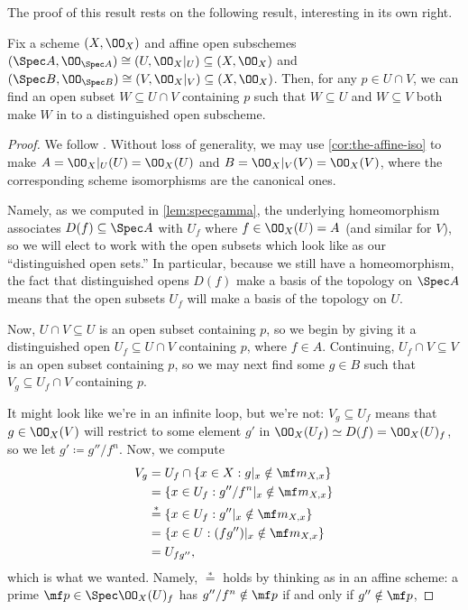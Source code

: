 \documentclass[../notes.tex]{subfiles}
\begin{document}
The proof of this result rests on the following result, interesting in its own right.
\begin{lemma} \label{lem:simul-distinguish}
	Fix a scheme $(X,\OO_X)$ and affine open subschemes $(\Spec A,\OO_{\Spec A})\cong (U,\OO_X|_U)\subseteq (X,\OO_X)$ and $(\Spec B,\OO_{\Spec B})\cong (V,\OO_X|_V)\subseteq (X,\OO_X)$. Then, for any $p\in U\cap V$, we can find an open subset $W\subseteq U\cap V$ containing $p$ such that $W\subseteq U$ and $W\subseteq V$ both make $W$ in to a distinguished open subscheme.
\end{lemma}
\begin{proof}
	We follow \cite[Proposition~5.3.1]{rising-sea}. Without loss of generality, we may use \autoref{cor:the-affine-iso} to make $A=\OO_X|_U(U)=\OO_X(U)$ and $B=\OO_X|_V(V)=\OO_X(V)$, where the corresponding scheme isomorphisms are the canonical ones.
	
	Namely, as we computed in \autoref{lem:specgamma}, the underlying homeomorphism associates $D(f)\subseteq\Spec A$ with $U_f$ where $f\in\OO_X(U)=A$ (and similar for $V$), so we will elect to work with the open subsets which look like as our ``distinguished open sets.'' In particular, because we still have a homeomorphism, the fact that distinguished opens $D(f)$ make a basis of the topology on $\Spec A$ means that the open subsets $U_f$ will make a basis of the topology on $U$.

	Now, $U\cap V\subseteq U$ is an open subset containing $p$, so we begin by giving it a distinguished open $U_{f}\subseteq U\cap V$ containing $p$, where $f\in A$. Continuing, $U_{f}\cap V\subseteq V$ is an open subset containing $p$, so we may next find some $g\in B$ such that $V_g\subseteq U_{f}\cap V$ containing $p$.
	
	It might look like we're in an infinite loop, but we're not: $V_g\subseteq U_{f}$ means that $g\in\OO_X(V)$ will restrict to some element $g'$ in $\OO_X(U_{f})\simeq D(f)=\OO_X(U)_{f}$, so we let $g'\coloneqq g''/f^n$. Now, we compute
	\begin{align*}
		V_g &= U_f\cap\{x\in X:g|_x\notin\mf m_{X,x}\} \\
		&= \left\{x\in U_f:g''/f^n|_x\notin\mf m_{X,x}\right\} \\
		&\stackrel*= \{x\in U_f:g''|_x\notin\mf m_{X,x}\} \\
		&= \{x\in U:(fg'')|_x\notin\mf m_{X,x}\} \\
		&= U_{fg''},
	\end{align*}
	which is what we wanted. Namely, $\stackrel*=$ holds by thinking as in an affine scheme: a prime $\mf p\in\Spec\OO_X(U)_f$ has $g''/f^n\notin\mf p$ if and only if $g''\notin\mf p$,
\end{proof}
\end{document}

